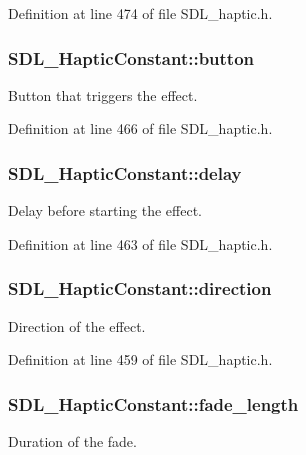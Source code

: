 Definition at line 474 of file S\-D\-L\-\_\-haptic.\-h.

\hypertarget{struct_s_d_l___haptic_constant_aa65321f1b002adaab6e629d5bed556e9}{
\subsubsection[{button}]{ S\-D\-L\-\_\-\-Haptic\-Constant\-::button}}\label{struct_s_d_l___haptic_constant_aa65321f1b002adaab6e629d5bed556e9}
Button that triggers the effect. 

Definition at line 466 of file S\-D\-L\-\_\-haptic.\-h.

\hypertarget{struct_s_d_l___haptic_constant_a16a751009893f5412201e3ce91146b25}{
\subsubsection[{delay}]{ S\-D\-L\-\_\-\-Haptic\-Constant\-::delay}}\label{struct_s_d_l___haptic_constant_a16a751009893f5412201e3ce91146b25}
Delay before starting the effect. 

Definition at line 463 of file S\-D\-L\-\_\-haptic.\-h.

\hypertarget{struct_s_d_l___haptic_constant_a3e871debf4e57c35960f019d2605d84f}{
\subsubsection[{direction}]{ S\-D\-L\-\_\-\-Haptic\-Constant\-::direction}}\label{struct_s_d_l___haptic_constant_a3e871debf4e57c35960f019d2605d84f}
Direction of the effect. 

Definition at line 459 of file S\-D\-L\-\_\-haptic.\-h.

\hypertarget{struct_s_d_l___haptic_constant_a647a6b761ac6ba16160d0892a12806bc}{
\subsubsection[{fade\-\_\-length}]{ S\-D\-L\-\_\-\-Haptic\-Constant\-::fade\-\_\-length}}\label{struct_s_d_l___haptic_constant_a647a6b761ac6ba16160d0892a12806bc}
Duration of the fade. 

